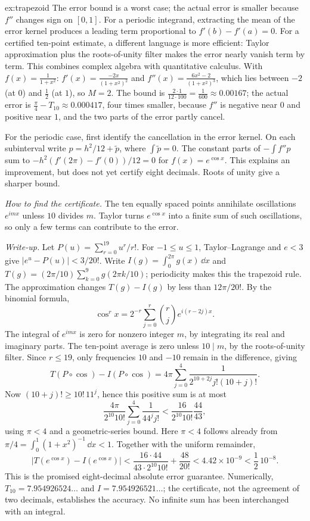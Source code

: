 \begin{solution}{ex:trapezoid}
\idea The error bound is a worst case; the actual error is smaller because $f''$ changes sign on $[0,1]$. For a periodic integrand, extracting the mean of the error kernel produces a leading term proportional to $f'(b)-f'(a)=0$. For a certified ten-point estimate, a different language is more efficient:
Taylor approximation plus the roots-of-unity filter makes the error nearly vanish
term by term. This combines complex algebra with quantitative calculus.
\writeup With $f(x)=\frac1{1+x^2}$: $f'(x)=\frac{-2x}{(1+x^2)^2}$ and $f''(x)=\frac{6x^2-2}{(1+x^2)^3}$, which lies between $-2$ (at $0$) and $\frac12$ (at $1$), so $M=2$. The bound is $\frac{2\cdot1}{12\cdot100}=\frac1{600}\approx0.00167$; the actual error is $\frac\pi4-T_{10}\approx0.000417$, four times smaller, because $f''$ is negative near $0$ and positive near $1$, and the two parts of the error partly cancel.

For the periodic case, first identify the cancellation in the error kernel.
On each subinterval write $p=h^2/12+\widetilde p$, where
$\int\widetilde p=0$. The constant parts of $-\int f''p$ sum to
$-h^2(f'(2\pi)-f'(0))/12=0$ for $f(x)=e^{\cos x}$.
This explains an improvement, but does not yet certify eight decimals.
Roots of unity give a sharper bound.

\emph{How to find the certificate.} The ten equally spaced points annihilate
oscillations $e^{imx}$ unless $10$ divides $m$. Taylor turns $e^{\cos x}$ into
a finite sum of such oscillations, so only a few terms can contribute to the error.

\emph{Write-up.} Let $P(u)=\sum_{r=0}^{19}u^r/r!$. For $-1\le u\le1$,
Taylor--Lagrange and $e<3$ give $|e^u-P(u)|<3/20!$.
Write $I(g)=\int_0^{2\pi}g(x)\,\dd x$ and
$T(g)=(2\pi/10)\sum_{k=0}^9g(2\pi k/10)$; periodicity makes this the
trapezoid rule. The approximation changes $T(g)-I(g)$ by less than $12\pi/20!$.
By the binomial formula,
\[
\cos^r x=2^{-r}\sum_{j=0}^r\binom rj e^{i(r-2j)x}.
\]
The integral of $e^{imx}$ is zero for nonzero integer $m$, by integrating
its real and imaginary parts. The ten-point average is zero unless $10\mid m$,
by the roots-of-unity filter. Since $r\le19$, only frequencies $10$ and $-10$
remain in the difference, giving
\[
T(P\circ\cos)-I(P\circ\cos)
=4\pi\sum_{j=0}^4\frac1{2^{10+2j}j!(10+j)!}.
\]
Now $(10+j)!\ge10!\,11^j$, hence this positive sum is at most
\[
\frac{4\pi}{2^{10}10!}\sum_{j=0}^4\frac1{44^j j!}
<\frac{16}{2^{10}10!}\frac{44}{43},
\]
using $\pi<4$ and a geometric-series bound. Here $\pi<4$ follows already from
$\pi/4=\int_0^1(1+x^2)^{-1}\,\dd x<1$.
Together with the uniform remainder,
\[
|T(e^{\cos x})-I(e^{\cos x})|
<\frac{16\cdot44}{43\cdot2^{10}10!}+\frac{48}{20!}
<4.42\times10^{-9}<\frac12\,10^{-8}.
\]
This is the promised eight-decimal absolute error guarantee. Numerically,
$T_{10}=7.954926524\ldots$ and $I=7.954926521\ldots$; the certificate, not the
agreement of two decimals, establishes the accuracy. No infinite sum has been
interchanged with an integral.
\end{solution}


